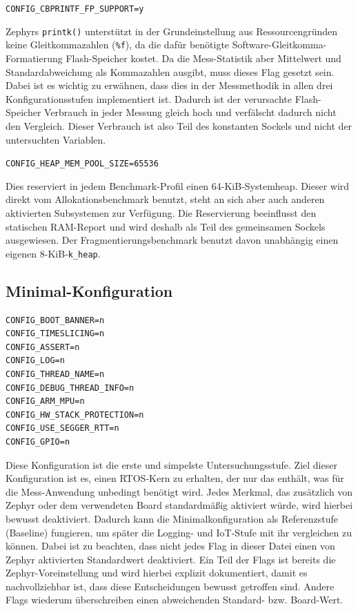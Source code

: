 \lstinline[style=fileinline]|CONFIG_CBPRINTF_FP_SUPPORT=y|

Zephyrs \lstinline[style=fileinline]|printk()| unterst{\"u}tzt in der Grundeinstellung aus Ressourcengr{\"u}nden keine Gleitkommazahlen (\lstinline[style=fileinline]|%f|), da die daf{\"u}r ben{\"o}tigte Software-Gleitkomma-Formatierung Flash-Speicher kostet. Da die Mess-Statistik aber Mittelwert und Standardabweichung als Kommazahlen ausgibt, muss dieses Flag gesetzt sein. Dabei ist es wichtig zu erw{\"a}hnen, dass dies in der Messmethodik in allen drei Konfigurationsstufen implementiert ist. Dadurch ist der verursachte Flash-Speicher Verbrauch in jeder Messung gleich hoch und verf{\"a}lscht dadurch nicht den Vergleich. Dieser Verbrauch ist also Teil des konstanten Sockels und nicht der untersuchten Variablen.

\lstinline[style=fileinline]|CONFIG_HEAP_MEM_POOL_SIZE=65536|

Dies reserviert in jedem Benchmark-Profil einen 64-KiB-Systemheap. Dieser wird direkt vom Allokationsbenchmark benutzt, steht an sich aber auch anderen aktivierten Subsystemen zur Verf{\"u}gung. Die Reservierung beeinflusst den statischen RAM-Report und wird deshalb als Teil des gemeinsamen Sockels ausgewiesen. Der Fragmentierungsbenchmark benutzt davon unabh{\"a}ngig einen eigenen 8-KiB-\lstinline[style=fileinline]|k_heap|.

\subsection{Minimal-Konfiguration}
\begin{lstlisting}[style=basecode,language=Kconfig]
CONFIG_BOOT_BANNER=n
CONFIG_TIMESLICING=n
CONFIG_ASSERT=n
CONFIG_LOG=n
CONFIG_THREAD_NAME=n
CONFIG_DEBUG_THREAD_INFO=n
CONFIG_ARM_MPU=n
CONFIG_HW_STACK_PROTECTION=n
CONFIG_USE_SEGGER_RTT=n
CONFIG_GPIO=n
\end{lstlisting}
Diese Konfiguration ist die erste und simpelste Untersuchungsstufe. Ziel dieser Konfiguration ist es, einen RTOS-Kern zu erhalten, der nur das enth{\"a}lt, was f{\"u}r die Mess-Anwendung unbedingt ben{\"o}tigt wird. Jedes Merkmal, das zus{\"a}tzlich von Zephyr oder dem verwendeten Board standardm{\"a}{\ss}ig aktiviert w{\"u}rde, wird hierbei bewusst deaktiviert. Dadurch kann die Minimalkonfiguration als Referenzstufe (Baseline) fungieren, um sp{\"a}ter die Logging- und IoT-Stufe mit ihr vergleichen zu k{\"o}nnen. Dabei ist zu beachten, dass nicht jedes Flag in dieser Datei einen von Zephyr aktivierten Standardwert deaktiviert. Ein Teil der Flags ist bereits die Zephyr-Voreinstellung und wird hierbei explizit dokumentiert, damit es nachvollziehbar ist, dass diese Entscheidungen bewusst getroffen sind. Andere Flags wiederum {\"u}berschreiben einen abweichenden Standard- bzw. Board-Wert.

